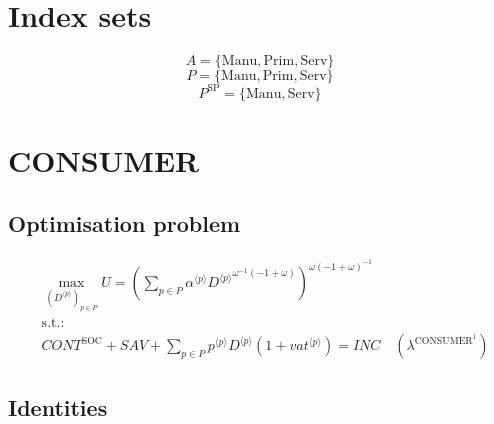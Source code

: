 

\section*{Index sets}

$$A = \{ \mathrm{Manu}, \mathrm{Prim}, \mathrm{Serv} \}$$
$$P = \{ \mathrm{Manu}, \mathrm{Prim}, \mathrm{Serv} \}$$
$$P^{\mathrm{SP}} = \{ \mathrm{Manu}, \mathrm{Serv} \}$$

\section{CONSUMER}

\subsection{Optimisation problem}

\begin{align}
&\max_{\left({D}^{\langle p\rangle}\right)_{p\in P}
} U = \left(\sum_{p\in P} {{\alpha}^{\langle p\rangle}} {{{D}^{\langle p\rangle}}^{{\omega}^{-1} \left(-1 + \omega\right)}}\right)^{{\omega} \left(-1 + \omega\right)^{-1}}\\
&\mathrm{s.t.:}\nonumber\\
& {C\!O\!N\!T}^{\mathrm{SOC}} + {S\!A\!V} + \sum_{p\in P} {{p}^{\langle p\rangle}} {{D}^{\langle p\rangle}} \left(1 + {{v\!a\!t}}^{\langle p\rangle}\right) = {I\!N\!C} \quad \left(\lambda^{\mathrm{CONSUMER}^{\mathrm{1}}}\right)
\end{align}


\subsection{Identities}

